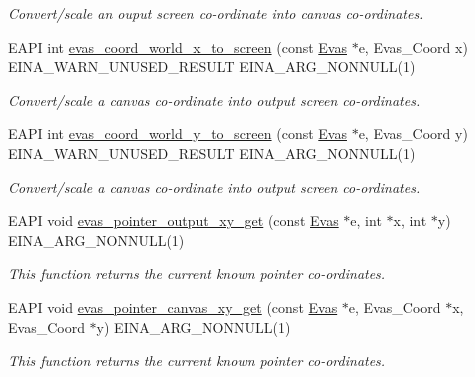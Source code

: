 \begin{DoxyCompactItemize}
\begin{DoxyCompactList}\small\item\em Convert/scale an ouput screen co-\/ordinate into canvas co-\/ordinates. \item\end{DoxyCompactList}\item 
EAPI int \hyperlink{group__Evas__Coord__Mapping__Group_ga3e4f9f6af852df00de8c180f2e3919e9}{evas\_\-coord\_\-world\_\-x\_\-to\_\-screen} (const \hyperlink{group__Evas__Canvas_ga5ff87cc4ce6bc43e3b640a6d37f73043}{Evas} $\ast$e, Evas\_\-Coord x) EINA\_\-WARN\_\-UNUSED\_\-RESULT EINA\_\-ARG\_\-NONNULL(1)
\begin{DoxyCompactList}\small\item\em Convert/scale a canvas co-\/ordinate into output screen co-\/ordinates. \item\end{DoxyCompactList}\item 
EAPI int \hyperlink{group__Evas__Coord__Mapping__Group_ga6c80c5dd33180044bcd200bb4739a2b8}{evas\_\-coord\_\-world\_\-y\_\-to\_\-screen} (const \hyperlink{group__Evas__Canvas_ga5ff87cc4ce6bc43e3b640a6d37f73043}{Evas} $\ast$e, Evas\_\-Coord y) EINA\_\-WARN\_\-UNUSED\_\-RESULT EINA\_\-ARG\_\-NONNULL(1)
\begin{DoxyCompactList}\small\item\em Convert/scale a canvas co-\/ordinate into output screen co-\/ordinates. \item\end{DoxyCompactList}\item 
EAPI void \hyperlink{group__Evas__Pointer__Group_gad8e78aded475fe26ea14b7410f510a98}{evas\_\-pointer\_\-output\_\-xy\_\-get} (const \hyperlink{group__Evas__Canvas_ga5ff87cc4ce6bc43e3b640a6d37f73043}{Evas} $\ast$e, int $\ast$x, int $\ast$y) EINA\_\-ARG\_\-NONNULL(1)
\begin{DoxyCompactList}\small\item\em This function returns the current known pointer co-\/ordinates. \item\end{DoxyCompactList}\item 
EAPI void \hyperlink{group__Evas__Pointer__Group_ga2f7bf87c9b1268e68c85d4bb8b9e4b15}{evas\_\-pointer\_\-canvas\_\-xy\_\-get} (const \hyperlink{group__Evas__Canvas_ga5ff87cc4ce6bc43e3b640a6d37f73043}{Evas} $\ast$e, Evas\_\-Coord $\ast$x, Evas\_\-Coord $\ast$y) EINA\_\-ARG\_\-NONNULL(1)
\begin{DoxyCompactList}\small\item\em This function returns the current known pointer co-\/ordinates. \item\end{DoxyCompactList}\item 

\end{DoxyCompactItemize}
